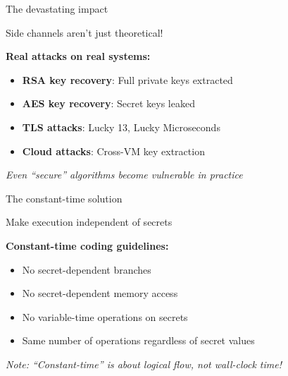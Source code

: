 \documentclass[aspectratio=169, lualatex, handout]{beamer}
\begin{document}
\begin{frame}{The devastating impact}
	\begin{center}
		\Large
		Side channels aren't just theoretical!
	\end{center}
	\vspace{1em}
	\textbf{Real attacks on real systems:}
	\begin{itemize}
		\item \textbf{RSA key recovery}: Full private keys extracted
		\item \textbf{AES key recovery}: Secret keys leaked
		\item \textbf{TLS attacks}: Lucky 13, Lucky Microseconds
		\item \textbf{Cloud attacks}: Cross-VM key extraction
	\end{itemize}
	\vspace{1em}
	\begin{center}
		\textit{Even ``secure'' algorithms become vulnerable in practice}
	\end{center}
\end{frame}

\begin{frame}{The constant-time solution}
	\begin{center}
		\Large
		Make execution independent of secrets
	\end{center}
	\vspace{1em}
	\textbf{Constant-time coding guidelines:}
	\begin{itemize}
		\item No secret-dependent branches
		\item No secret-dependent memory access
		\item No variable-time operations on secrets
		\item Same number of operations regardless of secret values
	\end{itemize}
	\vspace{0.5em}
	\begin{center}
		\textit{Note: ``Constant-time'' is about logical flow, not wall-clock time!}
	\end{center}
\end{frame}
\end{document}
